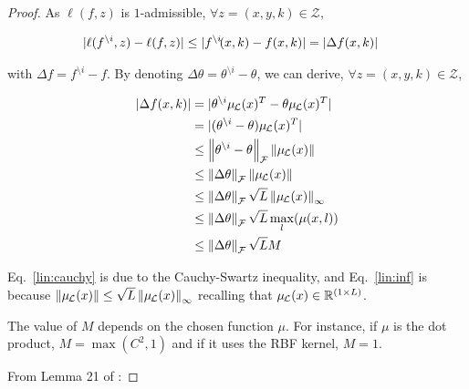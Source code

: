\begin{proof}

    As $\ell(f,z)$ is $1$-admissible, $\forall z=(x,y,k) \in \mathcal{Z}$,


    \begin{small}
    \begin{align}
      | \ell(f^{\setminus i},z) - \ell(f,z) | &\leq | f^{\setminus i}\!(x,k)-f(x,k) | = | \Delta f (x,k) | \label{lin:lossdiffabs}
    \end{align}
    \end{small}

    with $ \Delta f = f^{\setminus i} - f$.
    By denoting $\Delta\theta = \theta^{\setminus i} - \theta$, we can derive, $\forall z=(x,y,k) \in \mathcal{Z}$,

    
    \begin{align}
        \abs{\Delta f (x,k)} &= \abs{\theta^{\setminus i} \mul{x}^T - \theta \mul{x}^T} \nonumber \\
        &= \abs{(\theta^{\setminus i}- \theta)\mul{x}^T} \nonumber \\
        & \leq \normf{\theta^{\setminus i} - \theta} \norm{\mul{x}} \label{lin:cauchy} \\
        & \leq \normf{\Delta\theta} \norm{\mul{x}} \nonumber \\
        & \leq \normf{\Delta\theta} \sqrt{L} \norm{\mul{x}}_\infty \label{lin:inf} \\
        & \leq \normf{\Delta\theta} \sqrt{L} \max_l(\mu(x,l)) \nonumber \\
        & \leq \normf{\Delta\theta} \sqrt{L} M \label{lin:dthetasqlm}
    \end{align}

    Eq.~\eqref{lin:cauchy} is due to the Cauchy-Swartz inequality,
    and Eq.~\eqref{lin:inf} is because $ \norm{\mul{x}} \leq \sqrt{L} \norm{\mul{x}}_\infty$ recalling that $\mul{x} \in \mathbb{R}^{(1 \times L)}$.

    The value of $M$ depends on the chosen function $\mu$. For instance, if $\mu$ is the dot product, $M = \max(C^2,1)$ and if it uses the RBF kernel, $M = 1$.

    From Lemma 21 of \cite{bousquet2002stability}:


\end{proof}
